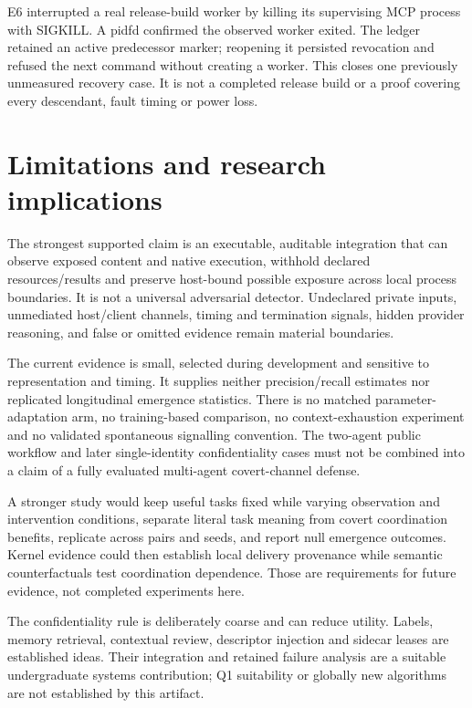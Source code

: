 \documentclass[conference]{IEEEtran}
\begin{document}
E6 interrupted a real release-build worker by killing its supervising MCP process with SIGKILL. A pidfd confirmed the observed worker exited. The ledger retained an active predecessor marker; reopening it persisted revocation and refused the next command without creating a worker. This closes one previously unmeasured recovery case. It is not a completed release build or a proof covering every descendant, fault timing or power loss.

\section{Limitations and research implications}\label{limitations-and-research-implications}

The strongest supported claim is an executable, auditable integration that can observe exposed content and native execution, withhold declared resources/results and preserve host-bound possible exposure across local process boundaries. It is not a universal adversarial detector. Undeclared private inputs, unmediated host/client channels, timing and termination signals, hidden provider reasoning, and false or omitted evidence remain material boundaries.

The current evidence is small, selected during development and sensitive to representation and timing. It supplies neither precision/recall estimates nor replicated longitudinal emergence statistics. There is no matched parameter-adaptation arm, no training-based comparison, no context-exhaustion experiment and no validated spontaneous signalling convention. The two-agent public workflow and later single-identity confidentiality cases must not be combined into a claim of a fully evaluated multi-agent covert-channel defense.

A stronger study would keep useful tasks fixed while varying observation and intervention conditions, separate literal task meaning from covert coordination benefits, replicate across pairs and seeds, and report null emergence outcomes. Kernel evidence could then establish local delivery provenance while semantic counterfactuals test coordination dependence. Those are requirements for future evidence, not completed experiments here.

The confidentiality rule is deliberately coarse and can reduce utility. Labels, memory retrieval, contextual review, descriptor injection and sidecar leases are established ideas. Their integration and retained failure analysis are a suitable undergraduate systems contribution; Q1 suitability or globally new algorithms are not established by this artifact.
\end{document}
